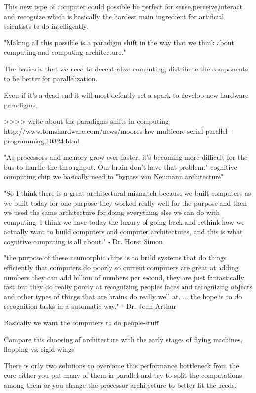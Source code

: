 \documentclass{article}
\begin{document}
This new type of computer could possible be perfect for sense,perceive,interact
and recognize which is basically the hardest main ingredient for artificial
scientists to do intelligently.

"Making all this possible is a paradigm shift in the way that we think about
computing and computing architecture."

The basics is that we need to decentralize computing, distribute the components
to be better for parallelization.

Even if it's a dead-end it will most defently set a spark to develop new
hardware paradigms.

>>>> write about the paradigms shifts in computing
http://www.tomshardware.com/news/moores-law-multicore-serial-parallel-programming,10324.html

"As processors and memory grow ever faster, it's becoming more difficult for
the bus to handle the throughput. Our brain don't have that problem."
cognitive computing chip
we basically need to "bypass von Neumann architecture"

    "So I think there is a great architectural mismatch because we built
    computers as we built today for one purpose they worked really well for the
    purpose and then we used the same architecture for doing everything else we
    can do with computing. I think we have today the luxury of going back and
    rethink how we actually want to build computers and computer architectures,
    and this is what cognitive computing is all about." - Dr. Horst Simon

    "the purpose of these neumorphic chips is to build systems that do things 
    efficiently that computers do poorly so current computers are great at
    adding numbers they can add billion of numbers per second, they are just
    fantastically fast but they do really poorly at recognizing peoples faces
    and recognizing objects and other types of things that are brains do really
    well at. ... the hope is to do recognition tasks in a automatic way." - Dr.
    John Arthur

    Basically we want the computers to do people-stuff

    Compare this choosing of architecture with the early stages of flying
    machines, flapping vs. rigid wings
    
    There is only two solutions to overcome this performance bottleneck from the
    core either you put many of them in parallel and try to split the
    computations among them or you change the processor architecture to better
    fit the needs.
\end{document}
